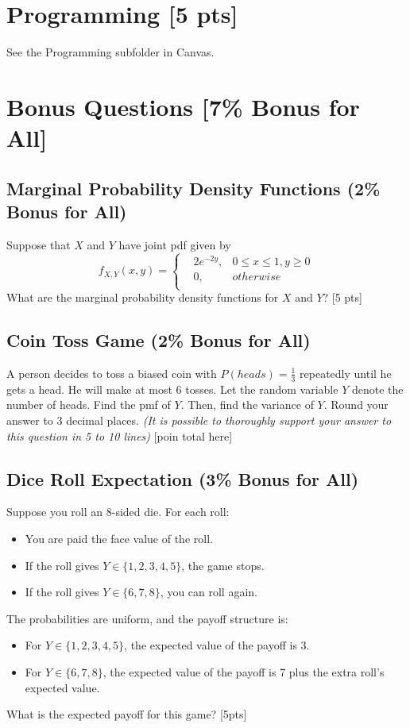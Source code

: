 \documentclass{article}
\begin{document}
\newpage

\section{Programming [5 pts]}
See the Programming subfolder in Canvas.
\newpage

\section{Bonus Questions [7\% Bonus for All]}
\subsection{Marginal Probability Density Functions (2\% Bonus for All)}
Suppose that $X$ and $Y$ have joint pdf given by
$$f_{X,Y}(x,y)=\left\{
\begin{aligned}
    &2e^{-2y}, & 0\leq x\leq1,y\geq0 \\
    &0, & otherwise\\
\end{aligned}\right.$$
What are the marginal probability density functions for $X$ and  $Y$? [5 pts]

\newpage

\subsection{Coin Toss Game (2\% Bonus for All)}
A person decides to toss a biased coin with $P(heads)= \frac{1}{3}$ repeatedly until he gets a head. He will make at most 6 tosses. Let the random variable $Y$ denote the number of heads. Find the pmf of $Y$. Then, find the variance of $Y$. Round your answer to 3 decimal places. \textit{(It is possible to thoroughly support your answer to this question in 5 to 10 lines)} [poin total here]  

\newpage

\subsection{Dice Roll Expectation (3\% Bonus for All)}
Suppose you roll an 8-sided die. For each roll:
\begin{itemize}
\item You are paid the face value of the roll.
\item If the roll gives $Y \in \{1, 2, 3, 4, 5\}$, the game stops.
\item If the roll gives $Y \in \{6, 7, 8\}$, you can roll again.
\end{itemize}
The probabilities are uniform, and the payoff structure is:
\begin{itemize}
\item For $Y \in \{1, 2, 3, 4, 5\}$, the expected value of the payoff is 3.
\item For $Y \in \{6, 7, 8\}$, the expected value of the payoff is 7 plus the extra roll's expected value.
\end{itemize}

What is the expected payoff for this game? [5pts]

\newpage

\printbibliography
\end{document}
